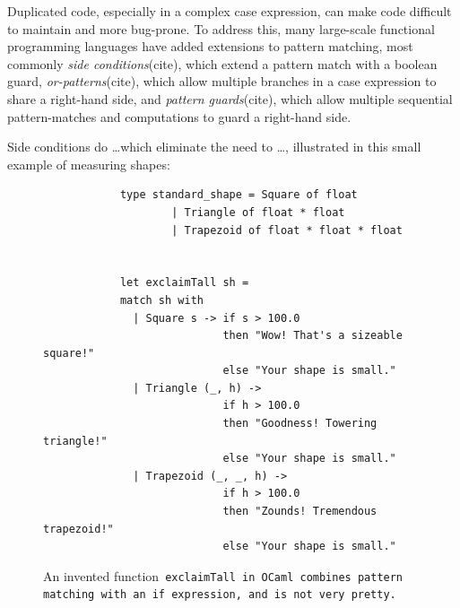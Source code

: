\documentclass[manuscript,screen 12pt, nonacm]{acmart}
\begin{document}
    Duplicated code, especially in a complex case expression, can make code
    difficult to maintain and more bug-prone. To address this, many large-scale
    functional programming languages have added extensions to pattern matching,
    most commonly \textit{side conditions}(cite), which extend a pattern match with a
    boolean guard, \textit{or-patterns}(cite), which allow multiple branches in a case
    expression to share a right-hand side, and \textit{pattern guards}(cite), which
    allow multiple sequential pattern-matches and computations to guard a
    right-hand side. 

    Side conditions do \dots which eliminate the need to \dots, 
    illustrated in this small example of measuring shapes: 


        \begin{figure}[ht]
        \begin{verbatim}
            type standard_shape = Square of float 
                    | Triangle of float * float
                    | Trapezoid of float * float * float
                    

            let exclaimTall sh =
            match sh with 
              | Square s -> if s > 100.0 
                            then "Wow! That's a sizeable square!"
                            else "Your shape is small." 
              | Triangle (_, h) -> 
                            if h > 100.0 
                            then "Goodness! Towering triangle!"
                            else "Your shape is small." 
              | Trapezoid (_, _, h) -> 
                            if h > 100.0
                            then "Zounds! Tremendous trapezoid!"
                            else "Your shape is small." 
            \end{verbatim}    
        \caption{An invented function~\tt{exclaimTall} in OCaml combines pattern
        matching with an~\tt{if} expression, and is not very pretty.}   
        \label{fig:ifexclaimtall}
    \end{figure}
\end{document}
